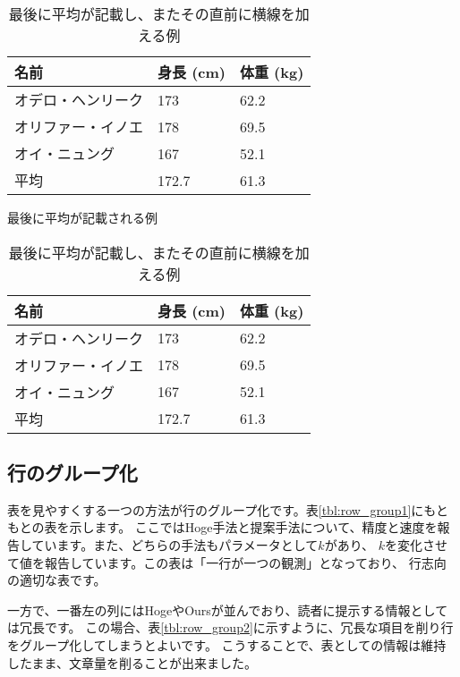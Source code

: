 \documentclass[uplatex,onecolumn,9pt,dvipdfmx]{jsarticle}
\newcommand{\Tref}[1]{表\ref{#1}}
\begin{document}
\begin{table}[h]
    \begin{minipage}{0.48\linewidth}
        \centering
        \begin{tabular}{@{}lll@{}} \toprule
            名前 & 身長 (cm) & 体重 (kg) \\ \midrule
            オデロ・ヘンリーク  & 173 & 62.2 \\ 
            オリファー・イノエ  & 178 & 69.5 \\
            オイ・ニュング      & 167 & 52.1 \\ 
            平均               & 172.7  & 61.3 \\ \bottomrule   
        \end{tabular}
        \caption{最後に平均が記載される例}
        \label{tbl:avg1}
    \end{minipage}
    \hfill
    \begin{minipage}{0.48\linewidth}
        \centering
        \begin{tabular}{@{}lll@{}} \toprule
            名前 & 身長 (cm) & 体重 (kg) \\ \midrule
            オデロ・ヘンリーク  & 173 & 62.2 \\ 
            オリファー・イノエ  & 178 & 69.5 \\
            オイ・ニュング      & 167 & 52.1 \\ \midrule
            平均               & 172.7  & 61.3 \\ \bottomrule   
        \end{tabular}
        \caption{最後に平均が記載し、またその直前に横線を加える例}
        \label{tbl:avg2}
    \end{minipage}
    \hfill
\end{table}



\subsection{行のグループ化}
表を見やすくする一つの方法が行のグループ化です。\Tref{tbl:row_group1}にもともとの表を示します。
ここではHoge手法と提案手法について、精度と速度を報告しています。また、どちらの手法もパラメータとして$k$があり、
$k$を変化させて値を報告しています。この表は「一行が一つの観測」となっており、
行志向の適切な表です。

一方で、一番左の列にはHogeやOursが並んでおり、読者に提示する情報としては冗長です。
この場合、\Tref{tbl:row_group2}に示すように、冗長な項目を削り行をグループ化してしまうとよいです。
こうすることで、表としての情報は維持したまま、文章量を削ることが出来ました。
\end{document}
